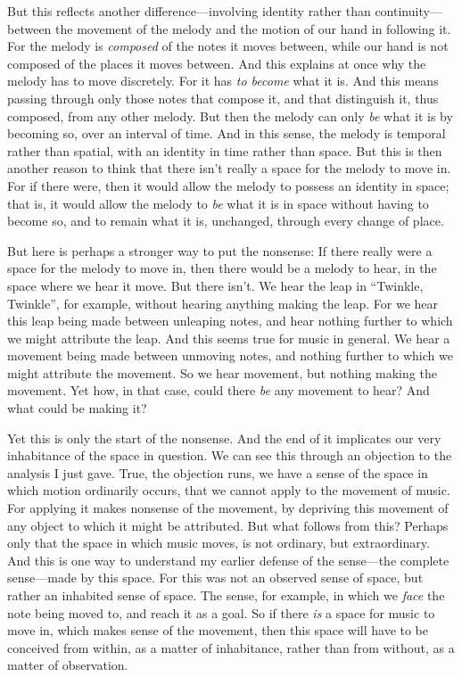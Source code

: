 \documentclass[12pt]{memoir}
\begin{document}
But this reflects another difference---involving
identity rather than continuity---between the
movement of the melody and the motion of our hand
in following it. For the melody is \emph{composed}
of the notes it moves between, while our hand is
not composed of the places it moves between. And
this explains at once why the melody has to move
discretely. For it has \emph{to become} what it
is. And this means passing through only those
notes that compose it, and that distinguish it,
thus composed, from any other melody. But then the
melody can only \emph{be} what it is by becoming
so, over an interval of time. And in this sense,
the melody is temporal rather than spatial, with
an identity in time rather than space. But this is
then another reason to think that there isn't
really a space for the melody to move in.  For if
there were, then it would allow the melody to
possess an identity in space; that is, it
would allow the melody to \emph{be} what it is in
space without having to become so, and to remain
what it is, unchanged, through every change of
place.

But here is perhaps a stronger way to put the
nonsense: If there really were a space for the
melody to move in, then there would be a melody
to hear, in the space where we hear it move.
But there isn't. We hear the leap in ``Twinkle,
Twinkle'', for example, without hearing anything
making the leap. For we hear this leap being
made between unleaping notes, and hear nothing
further to which we might attribute the leap. And
this seems true for music in general. We hear a
movement being made between unmoving notes, and
nothing further to which we might attribute the
movement. So we hear movement, but nothing making
the movement. Yet how, in that case, could there
\emph{be} any movement to hear? And what could be
making it?

Yet this is only the start of the nonsense. And
the end of it implicates our very inhabitance of
the space in question. We can see this through an
objection to the analysis I just gave. True, the
objection runs, we have a sense of the space in
which motion ordinarily occurs, that we cannot
apply to the movement of music. For applying it
makes nonsense of the movement, by depriving
this movement of any object to which it might be
attributed. But what follows from this? Perhaps
only that the space in which music moves, is
not ordinary, but extraordinary. And this is
one way to understand my earlier defense of the
sense---the complete sense---made by this space.
For this was not an observed sense of space, but
rather an inhabited sense of space. The sense, for
example, in which we \emph{face} the note being
moved to, and reach it as a goal. So if there
\emph{is} a space for music to move in, which
makes sense of the movement, then this space will
have to be conceived from within, as a matter of
inhabitance, rather than from without, as a matter
of observation.
\end{document}
